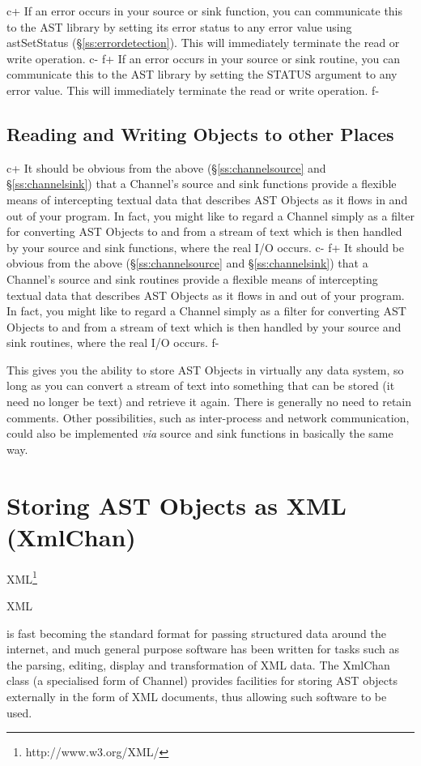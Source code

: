 \documentclass[twoside,11pt]{article}
\newcommand{\htmladdnormallink}[2]{#1}
\newenvironment{latexonly}{}{}
\newcommand{\secref}[1]{\S\ref{#1}}
\newcommand{\secref}[1]{\ref{#1}}
\begin{document}
c+
If an error occurs in your source or sink function, you can
communicate this to the AST library by setting its error status to any
error value using astSetStatus (\secref{ss:errordetection}). This will
immediately terminate the read or write operation.
c-
f+
If an error occurs in your source or sink routine, you can communicate
this to the AST library by setting the STATUS argument to any error
value. This will immediately terminate the read or write operation.
f-

\subsection{\label{ss:otherplaces}Reading and Writing Objects to other Places}

c+
It should be obvious from the above (\secref{ss:channelsource} and
\secref{ss:channelsink}) that a Channel's source and sink functions
provide a flexible means of intercepting textual data that describes
AST Objects as it flows in and out of your program. In fact, you might
like to regard a Channel simply as a filter for converting AST Objects
to and from a stream of text which is then handled by your source and
sink functions, where the real I/O occurs.
c-
f+
It should be obvious from the above (\secref{ss:channelsource} and
\secref{ss:channelsink}) that a Channel's source and sink routines
provide a flexible means of intercepting textual data that describes
AST Objects as it flows in and out of your program. In fact, you might
like to regard a Channel simply as a filter for converting AST Objects
to and from a stream of text which is then handled by your source and
sink routines, where the real I/O occurs.
f-

This gives you the ability to store AST Objects in virtually any data
system, so long as you can convert a stream of text into something
that can be stored (it need no longer be text) and retrieve it
again. There is generally no need to retain comments.  Other
possibilities, such as inter-process and network communication, could
also be implemented {\em{via}} source and sink functions in basically
the same way.

\cleardoublepage
\section{\label{ss:xmlchan}Storing AST Objects as XML (XmlChan)}

\begin{latexonly}
XML\footnote{http://www.w3.org/XML/}
\end{latexonly}
\begin{htmlonly}
\htmladdnormallink{XML}{http://www.w3.org/XML/}
\end{htmlonly}
is fast becoming the standard format for passing structured data around
the internet, and much general purpose software has been written for
tasks such as the parsing, editing, display and transformation of XML
data. The XmlChan class (a specialised form of Channel) provides
facilities for storing AST objects externally in the form of XML documents, 
thus allowing such software to be used.
\end{document}
